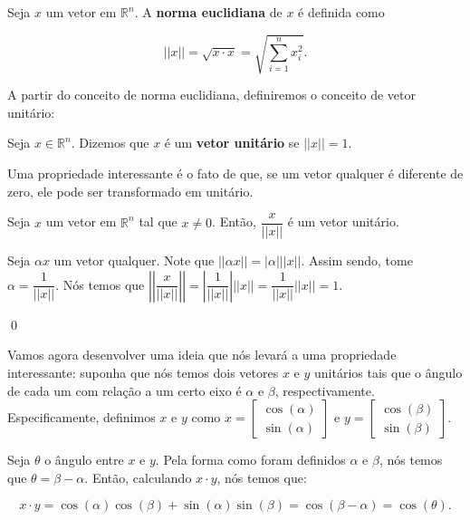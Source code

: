 \begin{Definition}
	Seja $x$ um vetor em $\mathbb{R}^n$. A \textbf{norma euclidiana} de $x$ é definida como
	
	$$
	||x|| = \sqrt{x\cdot x} = \sqrt{\sum\limits_{i = 1}^{n} x_i^2}.
	$$
\end{Definition}

A partir do conceito de norma euclidiana, definiremos o conceito de vetor unitário:

\begin{Definition}
	Seja $x\in\mathbb{R}^n$. Dizemos que $x$ é um \textbf{vetor unitário} se $||x|| = 1$.
\end{Definition}

Uma propriedade interessante é o fato de que, se um vetor qualquer é diferente de zero, ele pode ser transformado em unitário.

\begin{Proposition}
	Seja $x$ um vetor em $\mathbb{R}^n$ tal que $x\neq 0$. Então, $\dfrac{x}{||x||}$ é um vetor unitário.
\end{Proposition}

\begin{Proof}
	Seja $\alpha x$ um vetor qualquer. Note que $||\alpha x|| = |\alpha|||x||$. Assim sendo, tome $\alpha = \dfrac{1}{||x||}$. Nós temos que $\left|\left|\dfrac{x}{||x||}\right|\right| = \left|\dfrac{1}{||x||}\right|||x|| = \dfrac{1}{||x||}||x|| = 1$.
	
	\qed
\end{Proof}

Vamos agora desenvolver uma ideia que nós levará a uma propriedade interessante: suponha que nós temos dois vetores $x$ e $y$ unitários tais que o ângulo de cada um com relação a um certo eixo é $\alpha$ e $\beta$, respectivamente. Especificamente, definimos $x$ e $y$ como $x = \begin{bmatrix}
	\cos(\alpha) \\
	\sin(\alpha)
\end{bmatrix}$
e $y = \begin{bmatrix}
	\cos(\beta) \\
	\sin(\beta)
\end{bmatrix}$.

Seja $\theta$ o ângulo entre $x$ e $y$. Pela forma como foram definidos $\alpha$ e $\beta$, nós temos que $\theta = \beta - \alpha$. Então, calculando $x\cdot y$, nós temos que:

$$
x\cdot y = \cos(\alpha)\cos(\beta) + \sin(\alpha)\sin(\beta) = \cos(\beta - \alpha) = \cos(\theta).
$$

